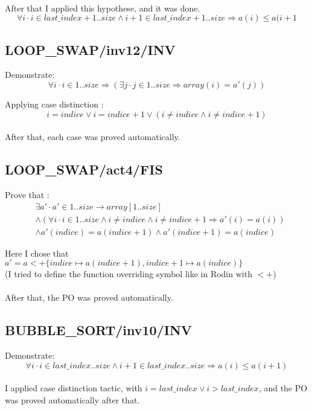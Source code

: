\paragraph{}
After that I applied this hypothese, and it was done.
$$
\forall i \cdot i \in last\_index+1..size \land i+1 \in last\_index+1..size \Rightarrow a(i) \leq a(i+1
$$

\subsection{LOOP\_SWAP/inv12/INV}
Demonstrate:
$$
\forall i \cdot i \in 1..size \Rightarrow (\exists j \cdot j \in 1..size \Rightarrow array(i)=a'(j))
$$

Applying case distinction : 
$$
i=indice \lor i=indice+1 \lor (i \neq indice \land i \neq indice+1)
$$
\paragraph{}
After that, each case was proved automatically.

\subsection{LOOP\_SWAP/act4/FIS}
Prove that :
\begin{align*}
&\exists a' \cdot a' \in 1..size \to array[1..size] \\ 
&\land (\forall i \cdot i \in 1..size \land i \neq indice \land i \neq indice+1 \Rightarrow a'(i)=a(i)) \\ 
&\land a'(indice) = a(indice+1) \land a'(indice+1) = a(indice)
\end{align*}

Here I chose that $ a' =  a <+ \{indice \mapsto a(indice+1), indice+1 \mapsto a(indice) \} $ \\
(I tried to define the function overriding symbol like in Rodin with $<+$) 

\paragraph{}
After that, the PO was proved automatically.

\subsection{BUBBLE\_SORT/inv10/INV}
Demonstrate:
$$
\forall i \cdot i \in last\_index..size \land i+1 \in last\_index..size \Rightarrow a(i) \leq a(i+1)
$$
\paragraph{}
I applied case distinction tactic, with $i = last\_index \lor i > last\_index$, and the PO was proved  automatically after that.

